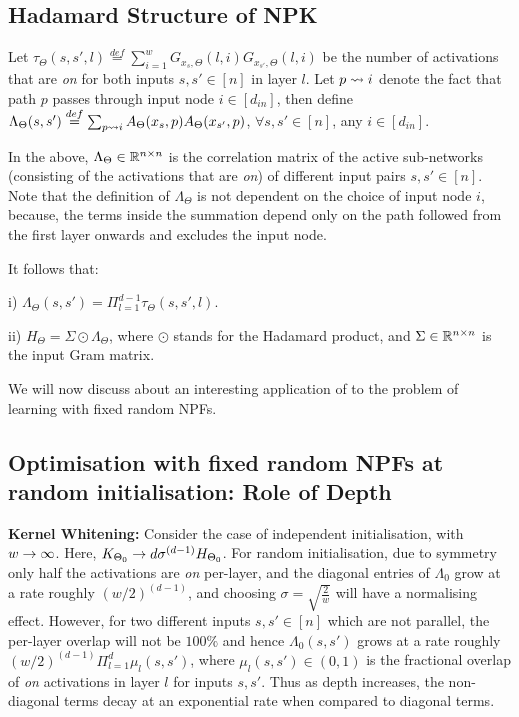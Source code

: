\subsection{Hadamard Structure of NPK}
\begin{definition}\label{def:lambda}
Let $\tau_{\Theta}(s,s',l)\stackrel{def}=\sum_{i=1}^w G_{x_s,\Theta}(l,i)G_{x_{s'},\Theta}(l,i)$ be the number of activations that are \emph{on} for both inputs $s,s'\in[n]$ in layer $l$. Let $p\rightsquigarrow i$ denote the fact that path $p$ passes through input node $i\in[d_{in}]$, then define $\Lambda_{\Theta}(s,s')\stackrel{def}{=}\sum_{p\rightsquigarrow i} A_{\Theta}(x_s,p) A_{\Theta}(x_{s'},p)$, $\forall s,s'\in[n]$, any $i\in [d_{in}]$.
\end{definition}
In the  above, $\Lambda_{\Theta}\in\mathbb{R}^{n\times n}$ is the correlation matrix of the active sub-networks (consisting of the activations that are \emph{on}) of different input pairs $s,s'\in[n]$. Note that the definition of $\Lambda_{\Theta}$ is not dependent on the choice of input node $i$, because, the terms inside the summation depend only on the path followed from the first layer onwards and excludes the input node.

\begin{lemma}\label{lm:npk}
It follows that:

i) $\Lambda_{\Theta}(s,s')=\Pi_{l=1}^{d-1}\tau_{\Theta}(s,s',l)$.

ii) $H_{\Theta}= \Sigma\odot\Lambda_{\Theta}$, where $\odot$ stands for the Hadamard product, and $\Sigma \in \mathbb{R}^{n\times n}$ is the input Gram matrix.
\end{lemma}


We will now discuss about an interesting application of  to the problem of learning with fixed random NPFs.
\subsection{Optimisation with fixed random NPFs at random initialisation: Role of Depth}
\textbf{Kernel Whitening:} Consider the case of independent initialisation, with $w\rightarrow\infty$. Here, $K_{\Theta_0}\rightarrow d\sigma^{(d-1)}H_{\Theta_0}$. For random initialisation, due to symmetry only half the activations are \emph{on} per-layer, and the diagonal entries of $\Lambda_0$ grow at a rate roughly $(w/2)^{(d-1)}$, and choosing $\sigma=\sqrt{\frac{2}w}$ will have a normalising effect. However, for two different inputs $s,s'\in[n]$ which are not parallel, the per-layer overlap will not be $100\%$ and hence $\Lambda_0(s,s')$ grows at a rate roughly $(w/2)^{(d-1)}\Pi_{l=1}^d \mu_l(s,s')$, where $\mu_{l}(s,s')\in(0,1)$ is the fractional overlap of \emph{on} activations in layer $l$ for inputs $s,s'$. Thus as depth increases, the non-diagonal terms decay at an exponential rate when compared to diagonal terms.

